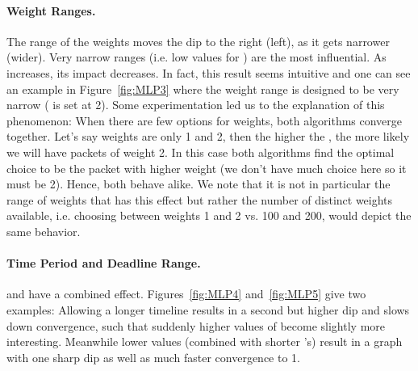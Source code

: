 \documentclass[oribibl]{llncs}
\begin{document}
\paragraph{Weight Ranges.} The range of the weights moves the dip to
the right (left), as it gets narrower (wider). Very narrow ranges
(i.e. low values for ) are the most influential. As 
increases, its impact decreases. In fact, this result seems intuitive
and one can see an example in Figure~\ref{fig:MLP3} where the weight
range is designed to be very narrow ( is set at
2). Some
experimentation led us to the explanation of this phenomenon: When
there are few options for weights, both algorithms converge
together. Let's say weights are only 1 and 2, then the higher the
, the more likely we will have packets of weight 2. In this
case both algorithms find the optimal choice to be the packet with
higher weight (we don't have much choice here so it must be 2). Hence,
both behave alike. We note that it is not in particular the range of
weights that has this effect but rather the number of distinct weights
available, i.e. choosing between weights 1 and 2 vs. 100 and 200,
would depict the same behavior.  



\paragraph{Time Period and Deadline Range.}  and  have a
combined effect. Figures~\ref{fig:MLP4} and~\ref{fig:MLP5} give two
examples: Allowing a longer timeline  results in a second but
higher dip and slows down convergence, such that suddenly higher
values of  become slightly more interesting. Meanwhile lower
 values (combined with shorter 's) result in a graph with
one sharp dip as well as much faster convergence to 1.
\end{document}
